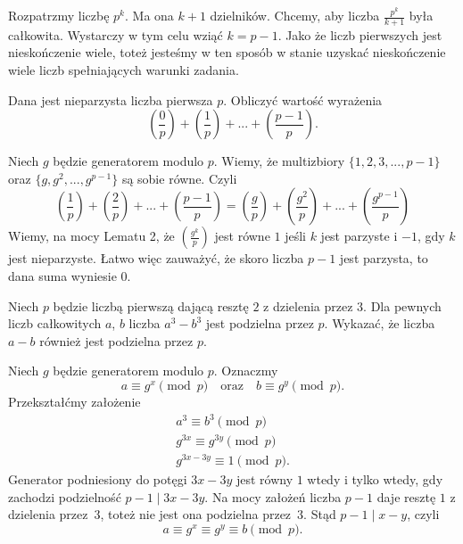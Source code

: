 \noindent
Rozpatrzmy liczbę $p^{k}$. Ma ona $k + 1$ dzielników. Chcemy, aby liczba $\frac{p^k}{k + 1}$ była całkowita. Wystarczy w tym celu wziąć $k = p - 1$. Jako że liczb pierwszych jest nieskończenie wiele, toteż jesteśmy w ten sposób w stanie uzyskać nieskończenie wiele liczb spełniających warunki zadania.

\vspace{10px}

\begin{problem}{4}
	Dana jest nieparzysta liczba pierwsza $p$. Obliczyć wartość wyrażenia
	\[
		\left(\frac{0}{p}\right) + 
		\left(\frac{1}{p}\right) + 
		... +
		\left(\frac{p - 1}{p}\right).
	\]
\end{problem}


\noindent
Niech $g$ będzie generatorem modulo $p$. Wiemy, że multizbiory $\{1, 2, 3, ..., p - 1\}$ oraz $\{g, g^2, ..., g^{p - 1}\}$ są sobie równe. Czyli
\[
		\left(\frac{1}{p}\right) + 
		\left(\frac{2}{p}\right) + 
		... +
		\left(\frac{p - 1}{p}\right) =
		\left(\frac{g}{p}\right) + 
		\left(\frac{g^2}{p}\right) + 
		... +
		\left(\frac{g^{p - 1}}{p}\right)
\]
Wiemy, na mocy Lematu 2, że $\left(\frac{g^k}{p}\right)$ jest równe $1$ jeśli $k$ jest parzyste i $-1$, gdy $k$ jest nieparzyste. Łatwo więc zauważyć, że skoro liczba $p - 1$ jest parzysta, to dana suma wyniesie $0$.

\begin{problem}{5}
	Niech $p$ będzie liczbą pierwszą dającą resztę $2$ z dzielenia przez $3$. Dla pewnych liczb całkowitych $a$, $b$ liczba $a^3 - b^3$ jest podzielna przez $p$. Wykazać, że liczba $a - b$ również jest podzielna przez $p$.
\end{problem}

\noindent
Niech $g$ będzie generatorem modulo $p$. Oznaczmy
\[
	a \equiv g^x \pmod{p} \quad \text{oraz} \quad b \equiv g^y \pmod{p}.
\]
Przekształćmy założenie
\begin{gather*}
	a^3 \equiv b^3 \pmod{p} \\
	g^{3x} \equiv g^{3y} \pmod{p} \\
	g^{3x - 3y} \equiv 1 \pmod{p}.
\end{gather*}
Generator podniesiony do potęgi $3x - 3y$ jest równy $1$ wtedy i tylko wtedy, gdy zachodzi podzielność ${p - 1 \mid 3x - 3y}$. Na mocy założeń liczba $p - 1$ daje resztę $1$ z dzielenia przez~$3$, toteż nie jest ona podzielna przez~$3$. Stąd $p - 1 \mid x - y$, czyli
\[
	a \equiv g^x \equiv g^y \equiv b \pmod{p}.
\]

